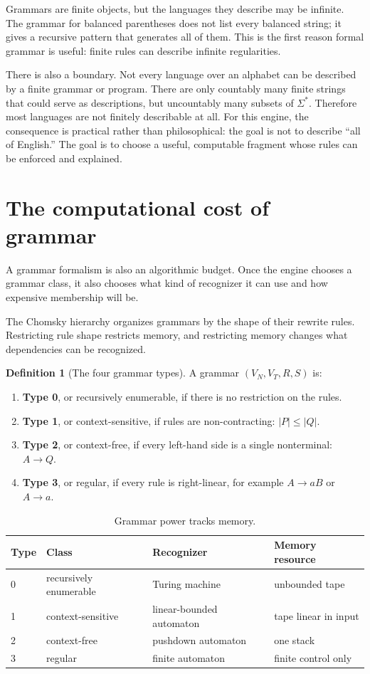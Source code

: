 \documentclass[11pt]{article}
\theoremstyle{definition}
\newtheorem{definition}{Definition}[section]
\theoremstyle{plain}
\theoremstyle{remark}
\newcommand{\Star}[1]{{#1}^{*}}
\begin{document}
Grammars are finite objects, but the languages they describe may be infinite. The grammar
for balanced parentheses does not list every balanced string; it gives a recursive pattern
that generates all of them. This is the first reason formal grammar is useful: finite rules
can describe infinite regularities.

There is also a boundary. Not every language over an alphabet can be described by a finite
grammar or program. There are only countably many finite strings that could serve as
descriptions, but uncountably many subsets of $\Star{\Sigma}$. Therefore most languages are
not finitely describable at all. For this engine, the consequence is practical rather than
philosophical: the goal is not to describe ``all of English.'' The goal is to choose a useful,
computable fragment whose rules can be enforced and explained.

\section{The computational cost of grammar}

A grammar formalism is also an algorithmic budget. Once the
engine chooses a grammar class, it also chooses what kind of recognizer it can use and how
expensive membership will be.

The Chomsky hierarchy organizes grammars by the shape of their rewrite rules. Restricting
rule shape restricts memory, and restricting memory changes what dependencies can be
recognized.

\begin{definition}[The four grammar types]
A grammar $(V_N,V_T,R,S)$ is:
\begin{enumerate}[leftmargin=2em]
  \item \textbf{Type 0}, or recursively enumerable, if there is no restriction on the rules.
  \item \textbf{Type 1}, or context-sensitive, if rules are non-contracting:
        $|P| \le |Q|$.
  \item \textbf{Type 2}, or context-free, if every left-hand side is a single nonterminal:
        $A \to Q$.
  \item \textbf{Type 3}, or regular, if every rule is right-linear, for example
        $A \to aB$ or $A \to a$.
\end{enumerate}
\end{definition}

\begin{table}[h]
\centering
\begin{tabular}{@{}llll@{}}
\toprule
Type & Class & Recognizer & Memory resource \\
\midrule
0 & recursively enumerable & Turing machine & unbounded tape \\
1 & context-sensitive & linear-bounded automaton & tape linear in input \\
2 & context-free & pushdown automaton & one stack \\
3 & regular & finite automaton & finite control only \\
\bottomrule
\end{tabular}
\caption{Grammar power tracks memory.}
\end{table}
\end{document}
